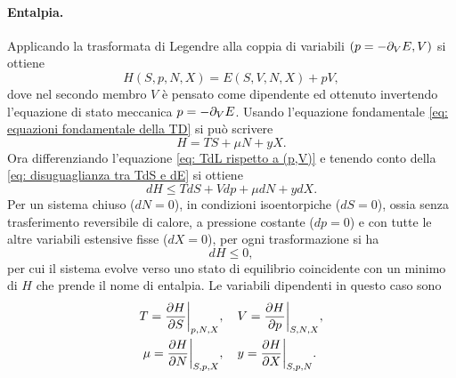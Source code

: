 \paragraph{Entalpia.} Applicando la trasformata di Legendre alla coppia di variabili $(p = -\partial_V E,V)$ si ottiene
\begin{equation}
\label{eq: TdL rispetto a (p,V)}
    H(S,p,N,X) = E(S,V,N,X) + pV,
\end{equation}
dove nel secondo membro $V$ è pensato come dipendente ed ottenuto invertendo l'equazione di stato meccanica $p = -\partial_V E$. Usando l'equazione fondamentale \eqref{eq: equazioni fondamentale della TD} si può scrivere 
\begin{equation}
\label{eq: espressione di H}
    H = TS + \mu N + yX.
\end{equation}
Ora differenziando l'equazione \eqref{eq: TdL rispetto a (p,V)} e tenendo conto della \eqref{eq: disuguaglianza tra TdS e dE} si ottiene
\begin{equation}
    dH \le TdS + Vdp +\mu dN +ydX.
\end{equation}
Per un sistema chiuso ($dN = 0$), in condizioni isoentorpiche ($dS = 0$), ossia senza trasferimento reversibile di calore, a pressione costante ($dp = 0$) e con tutte le altre variabili estensive fisse ($dX = 0$), per ogni trasformazione si ha
\begin{equation}
    dH \le 0,
\end{equation}
per cui il sistema evolve verso uno stato di equilibrio coincidente con un minimo di $H$ che prende il nome di entalpia. Le variabili dipendenti in questo caso sono 
\begin{equation}
\label{eq: equazioni di stato da H}
    \begin{split}
        T = \frac{\partial H}{\partial S}\bigg|_{p,N,X}&,\quad V = \frac{\partial H}{\partial p}\bigg|_{S,N,X}, \\
        \mu = \frac{\partial H}{\partial N}\bigg|_{S,p,X}&,\quad y = \frac{\partial H}{\partial X}\bigg|_{S,p,N}.
    \end{split}
\end{equation}

